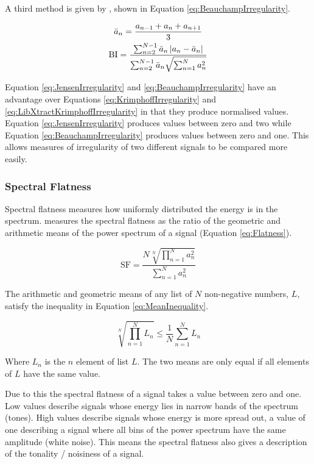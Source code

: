 			A third method is given by \citet{beauchamp2007analysis}, shown in Equation
			\ref{eq:BeauchampIrregularity}.

			\begin{gather}
			        \bar{a}_{n} = \frac{a_{n-1} + a_{n} + a_{n+1}}{3} \nonumber \\
				\textrm{BI} = \frac{\sum_{n = 2}^{N - 1} \bar{a}_{n} \left|a_{n} - \bar{a}_{n}\right|}
						   {\sum_{n = 2}^{N - 1} \bar{a}_{n} \sqrt{\sum_{n = 1}^{N} a_{n}^{2}}}
				\label{eq:BeauchampIrregularity}
			\end{gather}

			Equation \ref{eq:JensenIrregularity} and \ref{eq:BeauchampIrregularity} have an advantage over
			Equations \ref{eq:KrimphoffIrregularity} and \ref{eq:LibXtractKrimphoffIrregularity} in that they
			produce normalised values. Equation \ref{eq:JensenIrregularity} produces values between zero and two
			while Equation \ref{eq:BeauchampIrregularity} produces values between zero and one. This allows
			measures of irregularity of two different signals to be compared more easily.

		\subsubsection*{Spectral Flatness}
			Spectral flatness measures how uniformly distributed the energy is in the spectrum.
			\citet{johnston1988transform} measures the spectral flatness as the ratio of the geometric and
			arithmetic means of the power spectrum of a signal (Equation \ref{eq:Flatness}).

			\begin{equation}
				\textrm{SF} = \frac{N\sqrt[N]{\prod_{n = 1}^{N} a_{n}^{2}}}
						   {\sum_{n = 1}^{N} a_{n}^{2}}
				\label{eq:Flatness}
			\end{equation}

			The arithmetic and geometric means of any list of $N$ non-negative numbers, $L$, satisfy the
			inequality in Equation \ref{eq:MeanInequality}.

			\begin{equation}
				\sqrt[N]{\prod_{n = 1}^{N} L_{n}} \leq \frac{1}{N} \sum_{n = 1}^{N} L_{n}
				\label{eq:MeanInequality}
			\end{equation}

			Where $L_{n}$ is the $n$ element of list $L$. The two means are only equal if all elements
			of $L$ have the same value.

			Due to this the spectral flatness of a signal takes a value between zero and one. Low values
			describe signals whose energy lies in narrow bands of the spectrum (tones). High values describe
			signals whose energy is more spread out, a value of one describing a signal where all bins of the
			power spectrum have the same amplitude (white noise). This means the spectral flatness also gives a
			description of the tonality / noisiness of a signal.

